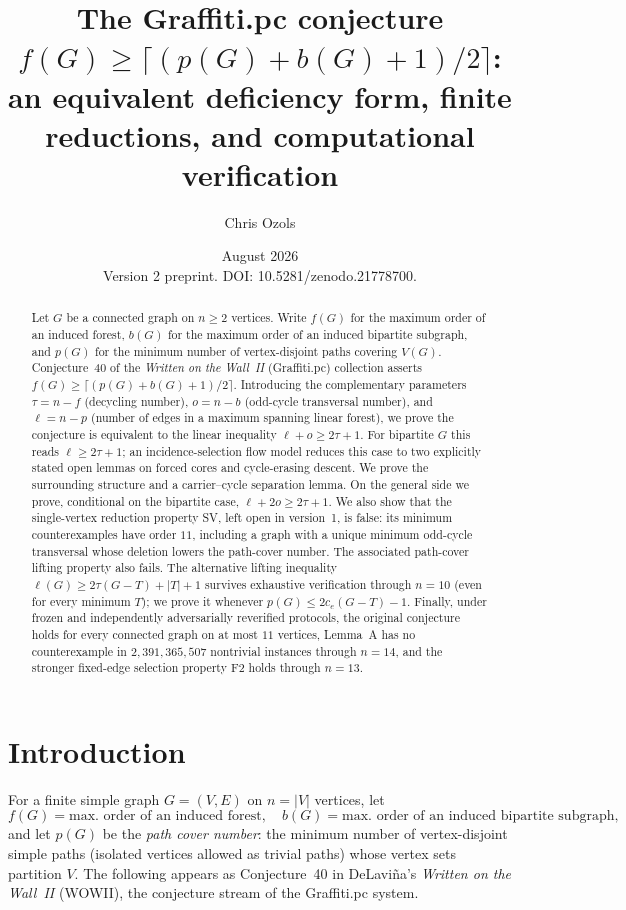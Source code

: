 \documentclass[11pt]{article}
\title{The Graffiti.pc conjecture $f(G)\ge\lceil (p(G)+b(G)+1)/2\rceil$:
an equivalent deficiency form, finite reductions, and computational
verification}
\author{Chris Ozols}
\date{August 2026\\[4pt]\normalsize Version 2 preprint. DOI:
10.5281/zenodo.21778700.}
\theoremstyle{plain}
\theoremstyle{definition}
\newcommand{\FVS}{\tau}
\newcommand{\OCT}{o}
\newcommand{\lf}{\ell}
\begin{document}
\maketitle

\begin{abstract}
Let $G$ be a connected graph on $n\ge 2$ vertices. Write $f(G)$ for the maximum
order of an induced forest, $b(G)$ for the maximum order of an induced bipartite
subgraph, and $p(G)$ for the minimum number of vertex-disjoint paths covering
$V(G)$. Conjecture~40 of the \emph{Written on the Wall~II} (Graffiti.pc)
collection asserts $f(G)\ge\lceil(p(G)+b(G)+1)/2\rceil$. Introducing the
complementary parameters $\FVS=n-f$ (decycling number), $\OCT=n-b$ (odd-cycle
transversal number), and $\lf=n-p$ (number of edges in a maximum spanning linear
forest), we prove the conjecture is equivalent to the linear inequality
$\lf+\OCT\ge 2\FVS+1$. For bipartite $G$ this reads $\lf\ge2\FVS+1$; an
incidence-selection flow model reduces this case to two explicitly stated open
lemmas on forced cores and cycle-erasing descent. We prove the surrounding
structure and a carrier--cycle separation lemma. On the general side we prove,
conditional on the bipartite case, $\lf+2\OCT\ge2\FVS+1$. We also show that the
single-vertex reduction property SV, left open in version~1, is false: its
minimum counterexamples have order $11$, including a graph with a unique
minimum odd-cycle transversal whose deletion lowers the path-cover number.
The associated path-cover lifting property also fails. The alternative lifting
inequality $\lf(G)\ge2\FVS(G-T)+|T|+1$ survives exhaustive verification through
$n=10$ (even for every minimum $T$); we prove it whenever
$p(G)\le2c_e(G-T)-1$. Finally, under frozen and independently adversarially
reverified protocols, the original conjecture holds for every connected graph
on at most $11$ vertices, Lemma~A has no counterexample in
$2{,}391{,}365{,}507$ nontrivial instances through $n=14$, and the stronger
fixed-edge selection property F2 holds through $n=13$.
\end{abstract}

\section{Introduction}\label{sec:intro}

For a finite simple graph $G=(V,E)$ on $n=|V|$ vertices, let
\[
f(G)=\text{max.\ order of an induced forest},\quad
b(G)=\text{max.\ order of an induced bipartite subgraph},
\]
and let $p(G)$ be the \emph{path cover number}: the minimum number of
vertex-disjoint simple paths (isolated vertices allowed as trivial paths) whose
vertex sets partition $V$. The following appears as Conjecture~40 in DeLavi\~na's
\emph{Written on the Wall~II} (WOWII), the conjecture stream of the Graffiti.pc
system.
\end{document}
